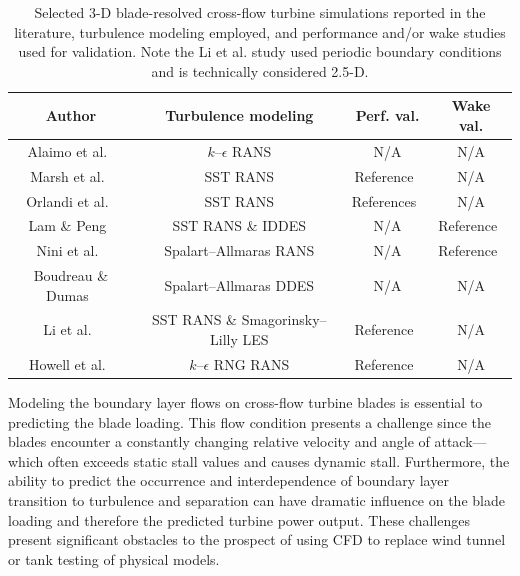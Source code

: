 \documentclass[aip,graphicx]{revtex4-1}
\begin{document}
\begin{table}
    \centering
    \begin{tabular}{c|c|c|c}
        Author & Turbulence modeling & Perf. val. & Wake val. \\
        \hline
        Alaimo et al.~\cite{Alaimo2015} & $k$--$\epsilon$ RANS & N/A & N/A \\
        Marsh et al.~\cite{Marsh2015} & SST RANS & Reference~\cite{Rawlings2008} & N/A \\
        Orlandi et al.~\cite{Orlandi2015} & SST RANS & References~\cite{Akins1989,Mertens2003} & N/A \\
        Lam \& Peng~\cite{Lam2016} & SST RANS \& IDDES & N/A & Reference~\cite{Tescione2014} \\
        Nini et al.~\cite{Nini2014} & Spalart--Allmaras RANS & N/A & Reference~\cite{Battisti2011} \\
        Boudreau \& Dumas~\cite{Boudreau2015} & Spalart--Allmaras DDES & N/A & N/A \\
        Li et al.~\cite{Li2013} & SST RANS \& Smagorinsky--Lilly LES & Reference~\cite{McLaren2011} & N/A \\
        Howell et al.~\cite{Howell2010} & $k$--$\epsilon$ RNG RANS & Reference~\cite{Howell2010} & N/A
    \end{tabular}

    \caption{Selected 3-D blade-resolved cross-flow turbine simulations reported
        in the literature, turbulence modeling employed, and performance and/or wake
        studies used for validation. Note the Li et al. study used periodic boundary
        conditions and is technically considered 2.5-D.}

    \label{tab:cfd-refs}
\end{table}

Modeling the boundary layer flows on cross-flow turbine blades is essential to
predicting the blade loading. This flow condition presents a challenge since the
blades encounter a constantly changing relative velocity and angle of
attack---which often exceeds static stall values and causes dynamic stall.
Furthermore, the ability to predict the occurrence and interdependence of
boundary layer transition to turbulence and separation can have dramatic
influence on the blade loading and therefore the predicted turbine power output.
These challenges present significant obstacles to the prospect of using CFD to
replace wind tunnel or tank testing of physical models.
\end{document}
